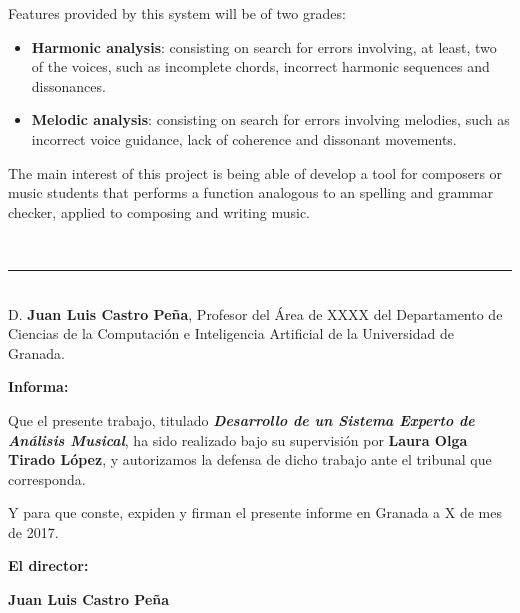 \documentclass[a4paper, 12pt]{report} %
\numberwithin{equation}{section} %
\numberwithin{figure}{section} %
\numberwithin{table}{section} %
\begin{document}
\bigskip

Features provided by this system will be of two grades:

\begin{itemize}
	\item \textbf{Harmonic analysis}: consisting on search for errors involving, at least, two of the voices, such as incomplete chords, incorrect harmonic sequences and  dissonances.
	\item  \textbf{Melodic analysis}: consisting on search for errors involving melodies, such as incorrect voice guidance, lack of coherence and dissonant movements. 
\end{itemize}

\bigskip

The main interest of this project is being able of develop a tool for composers or music students that performs a function analogous to an spelling and grammar checker, applied to composing and writing music. 

\newpage
\thispagestyle{empty}
\

\noindent\rule[-1ex]{\textwidth}{2pt}\\[4.5ex]

D. \textbf{Juan Luis Castro Peña}, Profesor del Área de XXXX del Departamento de Ciencias de la Computación e Inteligencia Artificial de la Universidad de Granada.

\vspace{0.5cm}

\textbf{Informa:}

\vspace{0.5cm}

Que el presente trabajo, titulado \textit{\textbf{Desarrollo de un Sistema Experto de Análisis Musical}},
ha sido realizado bajo su supervisión por \textbf{Laura Olga Tirado López}, y autorizamos la defensa de dicho trabajo ante el tribunal que corresponda.

\vspace{0.5cm}

Y para que conste, expiden y firman el presente informe en Granada a X de mes de 2017.

\vspace{1cm}

\textbf{El director:}

\vspace{5cm}

\noindent \textbf{Juan Luis Castro Peña}

\newpage
\thispagestyle{empty}
\
\end{document}
